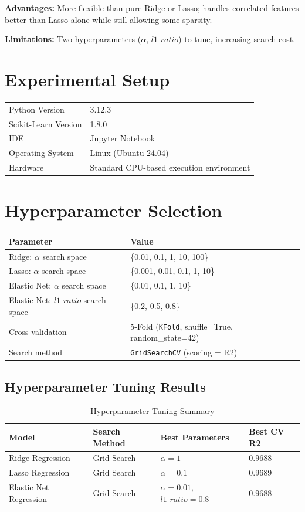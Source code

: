 \documentclass[12pt,a4paper]{article}
\begin{document}
\textbf{Advantages:} More flexible than pure Ridge or Lasso; handles correlated features better
than Lasso alone while still allowing some sparsity.

\textbf{Limitations:} Two hyperparameters ($\alpha$, $l1\_ratio$) to tune, increasing search cost.

\section{Experimental Setup}
\begin{tabular}{ll}
\toprule
Python Version & 3.12.3 \\
Scikit-Learn Version & 1.8.0 \\
IDE & Jupyter Notebook \\
Operating System & Linux (Ubuntu 24.04) \\
Hardware & Standard CPU-based execution environment \\
\bottomrule
\end{tabular}

\section{Hyperparameter Selection}

\begin{tabular}{ll}
\toprule
Parameter & Value\\
\midrule
Ridge: $\alpha$ search space & \{0.01, 0.1, 1, 10, 100\} \\
Lasso: $\alpha$ search space & \{0.001, 0.01, 0.1, 1, 10\} \\
Elastic Net: $\alpha$ search space & \{0.01, 0.1, 1, 10\} \\
Elastic Net: $l1\_ratio$ search space & \{0.2, 0.5, 0.8\} \\
Cross-validation & 5-Fold (\texttt{KFold}, shuffle=True, random\_state=42) \\
Search method & \texttt{GridSearchCV} (scoring = R2) \\
\bottomrule
\end{tabular}

\subsection*{Hyperparameter Tuning Results}
\begin{table}[H]
\centering
\caption{Hyperparameter Tuning Summary}
\begin{tabular}{llll}
\toprule
Model & Search Method & Best Parameters & Best CV R2 \\
\midrule
Ridge Regression & Grid Search & $\alpha = 1$ & 0.9688 \\
Lasso Regression & Grid Search & $\alpha = 0.1$ & 0.9689 \\
Elastic Net Regression & Grid Search & $\alpha = 0.01$, $l1\_ratio = 0.8$ & 0.9688 \\
\bottomrule
\end{tabular}
\end{table}
\end{document}
